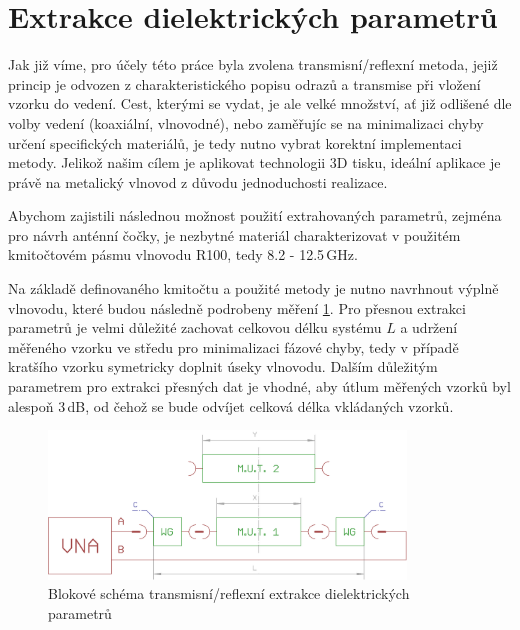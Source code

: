 \section{Extrakce dielektrických parametrů}
Jak již víme, pro účely této práce byla zvolena transmisní/reflexní metoda, jejiž princip je odvozen z charakteristického popisu odrazů a transmise při vložení vzorku do vedení. Cest, kterými se vydat, je ale velké množství, ať již odlišené dle volby vedení (koaxiální, vlnovodné), nebo zaměřujíc se na minimalizaci chyby určení specifických materiálů, je tedy nutno vybrat korektní implementaci metody. Jelikož našim cílem je aplikovat technologii 3D tisku, ideální aplikace je právě na metalický vlnovod z důvodu jednoduchosti realizace.

Abychom zajistili následnou možnost použití extrahovaných parametrů, zejména pro návrh anténní čočky, je nezbytné materiál charakterizovat v použitém kmitočtovém pásmu vlnovodu R100, tedy 8.2 - 12.5\,GHz.

Na základě definovaného kmitočtu a použité metody je nutno navrhnout výplně vlnovodu, které budou následně podrobeny měření \ref{fig:ExtractBlock}. Pro přesnou extrakci parametrů je velmi důležité zachovat celkovou délku systému $L$ a udržení měřeného vzorku ve středu pro minimalizaci fázové chyby, tedy v případě kratšího vzorku symetricky doplnit úseky vlnovodu. Dalším důležitým parametrem pro extrakci přesných dat je vhodné, aby útlum měřených vzorků byl alespoň 3\,dB, od čehož se bude odvíjet celková délka vkládaných vzorků.

\begin{figure}[!htbp!]
\begin{center}
\includegraphics[width=9.5cm]{pics/ExtractBlock}
\caption{Blokové schéma transmisní/reflexní extrakce dielektrických parametrů}
\label{fig:ExtractBlock}
\end{center}
\end{figure} 



